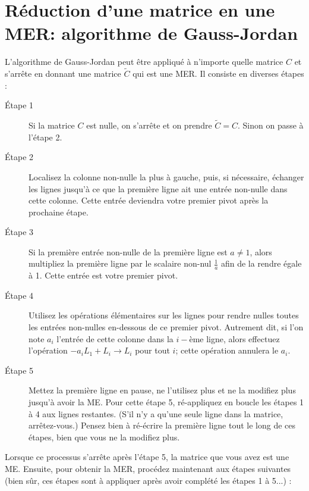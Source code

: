 \section{Réduction d'une matrice en une MER:  algorithme de Gauss-Jordan}

L'algorithme de Gauss-Jordan peut être appliqué à n'importe quelle matrice $C$ et s'arrête en donnant une matrice $\tilde C$ qui est une MER. Il consiste en diverses \'etapes :


\begin{description}
\item[\'Etape 1] Si la matrice $C$ est nulle, on s'arrête et on prendre $\tilde C = C$. Sinon on passe à l'étape 2.
\item[Étape 2] Localisez la colonne non-nulle la plus à gauche, puis, si n\'ecessaire, \'echanger les lignes jusqu'\`a ce que la premi\`ere ligne ait une entrée non-nulle dans cette colonne. Cette entr\'ee deviendra votre premier pivot après la prochaine \'etape.
\item [Étape 3] Si la première entr\'ee non-nulle de la première ligne est $a\neq 1$, alors multipliez la premi\`ere ligne par le scalaire non-nul $\frac1a$ afin de la rendre \'egale \`a 1. Cette entrée est votre premier pivot.
\item [Étape 4] Utilisez les op\'erations \'el\'ementaires sur les lignes pour rendre nulles toutes les entr\'ees non-nulles en-dessous de ce premier pivot.  Autrement dit, si l'on note $a_i$ l'entrée de cette colonne dans la $i-$\`eme ligne, alors effectuez l'op\'eration $-a_i L_1+L_i \to L_i$ pour tout $i$; cette op\'eration annulera le $a_i$.
\item[Étape 5] Mettez la première ligne en pause, ne l'utilisez plus et ne la modifiez plus jusqu'\`a avoir la ME. Pour cette étape 5, r\'e-appliquez en boucle les \'etapes 1 \`a 4 aux lignes restantes. (S'il n'y a qu'une seule ligne dans la matrice, arrêtez-vous.) Pensez bien à ré-écrire la premi\`ere ligne tout le long de ces \'etapes, bien que vous ne la modifiez plus. 
\end{description}
Lorsque ce processus s'arrête après l'étape 5, la matrice que vous avez
est une ME. 
Ensuite, pour obtenir la MER, procédez maintenant aux étapes suivantes (bien s\^ur, ces étapes sont à appliquer apr\`es avoir compl\'et\'e les \'etapes 1 \`a 5...) :
